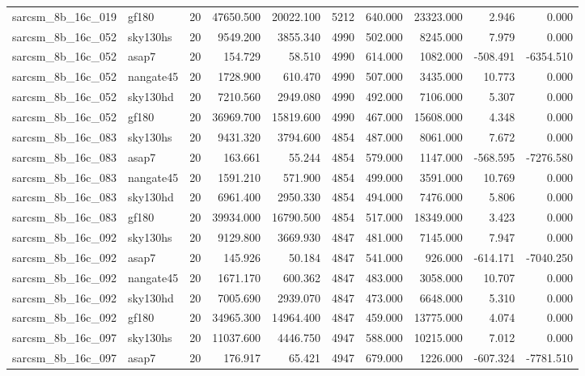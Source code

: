 \documentclass{article}
\begin{document}
\begin{longtable}{llrrrrrrrr}
sarcsm\_8b\_16c\_019 & gf180 & 20 & 47650.500 & 20022.100 & 5212 & 640.000 & 23323.000 & 2.946 & 0.000 \\
sarcsm\_8b\_16c\_052 & sky130hs & 20 & 9549.200 & 3855.340 & 4990 & 502.000 & 8245.000 & 7.979 & 0.000 \\
sarcsm\_8b\_16c\_052 & asap7 & 20 & 154.729 & 58.510 & 4990 & 614.000 & 1082.000 & -508.491 & -6354.510 \\
sarcsm\_8b\_16c\_052 & nangate45 & 20 & 1728.900 & 610.470 & 4990 & 507.000 & 3435.000 & 10.773 & 0.000 \\
sarcsm\_8b\_16c\_052 & sky130hd & 20 & 7210.560 & 2949.080 & 4990 & 492.000 & 7106.000 & 5.307 & 0.000 \\
sarcsm\_8b\_16c\_052 & gf180 & 20 & 36969.700 & 15819.600 & 4990 & 467.000 & 15608.000 & 4.348 & 0.000 \\
sarcsm\_8b\_16c\_083 & sky130hs & 20 & 9431.320 & 3794.600 & 4854 & 487.000 & 8061.000 & 7.672 & 0.000 \\
sarcsm\_8b\_16c\_083 & asap7 & 20 & 163.661 & 55.244 & 4854 & 579.000 & 1147.000 & -568.595 & -7276.580 \\
sarcsm\_8b\_16c\_083 & nangate45 & 20 & 1591.210 & 571.900 & 4854 & 499.000 & 3591.000 & 10.769 & 0.000 \\
sarcsm\_8b\_16c\_083 & sky130hd & 20 & 6961.400 & 2950.330 & 4854 & 494.000 & 7476.000 & 5.806 & 0.000 \\
sarcsm\_8b\_16c\_083 & gf180 & 20 & 39934.000 & 16790.500 & 4854 & 517.000 & 18349.000 & 3.423 & 0.000 \\
sarcsm\_8b\_16c\_092 & sky130hs & 20 & 9129.800 & 3669.930 & 4847 & 481.000 & 7145.000 & 7.947 & 0.000 \\
sarcsm\_8b\_16c\_092 & asap7 & 20 & 145.926 & 50.184 & 4847 & 541.000 & 926.000 & -614.171 & -7040.250 \\
sarcsm\_8b\_16c\_092 & nangate45 & 20 & 1671.170 & 600.362 & 4847 & 483.000 & 3058.000 & 10.707 & 0.000 \\
sarcsm\_8b\_16c\_092 & sky130hd & 20 & 7005.690 & 2939.070 & 4847 & 473.000 & 6648.000 & 5.310 & 0.000 \\
sarcsm\_8b\_16c\_092 & gf180 & 20 & 34965.300 & 14964.400 & 4847 & 459.000 & 13775.000 & 4.074 & 0.000 \\
sarcsm\_8b\_16c\_097 & sky130hs & 20 & 11037.600 & 4446.750 & 4947 & 588.000 & 10215.000 & 7.012 & 0.000 \\
sarcsm\_8b\_16c\_097 & asap7 & 20 & 176.917 & 65.421 & 4947 & 679.000 & 1226.000 & -607.324 & -7781.510 \\

\end{longtable}
\end{document}
